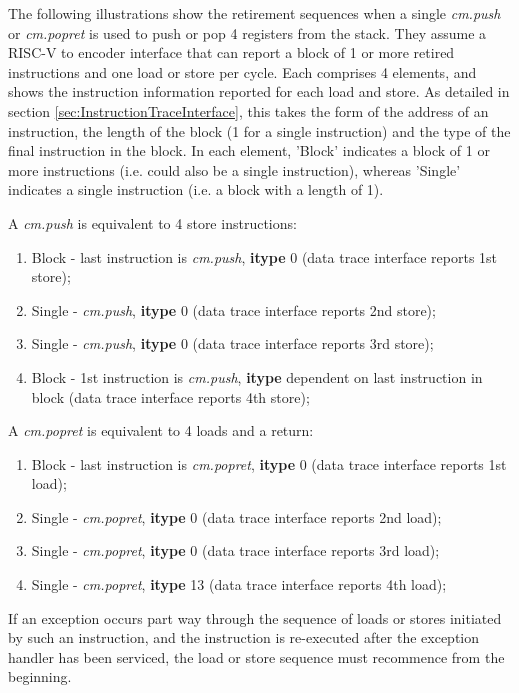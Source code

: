 The following illustrations show the retirement sequences when a single 
\textit{cm.push} or \textit{cm.popret} is used to push or pop 4 registers from the stack.
They assume a RISC-V to encoder interface that can report a block of 1 or more retired instructions 
and one load or store per cycle.  Each comprises 4 elements, and shows the instruction information 
reported for each load and store.  As detailed in section \ref{sec:InstructionTraceInterface}, this takes the 
form of the address of an instruction, the length of the block (1 for a single instruction) and the type of the final 
instruction in the block.  In each element, 'Block' indicates a block of 1 or more instructions 
(i.e. could also be a single instruction), whereas 'Single' indicates a single instruction (i.e. a block with a length of 1).

A \textit{cm.push} is equivalent to 4 store instructions:
\begin{enumerate}
  \item Block - last instruction is \textit{cm.push}, \textbf{itype} 0 (data trace interface reports 1st store);
  \item Single - \textit{cm.push}, \textbf{itype} 0 (data trace interface reports 2nd store);
  \item Single - \textit{cm.push}, \textbf{itype} 0 (data trace interface reports 3rd store);
  \item Block - 1st instruction is \textit{cm.push}, \textbf{itype} dependent on last instruction in block (data trace interface reports 4th store);
\end{enumerate}

A \textit{cm.popret} is equivalent to 4 loads and a return:
\begin{enumerate}
  \item Block - last instruction is \textit{cm.popret}, \textbf{itype} 0 (data trace interface reports 1st load);
  \item Single - \textit{cm.popret}, \textbf{itype} 0 (data trace interface reports 2nd load);
  \item Single - \textit{cm.popret}, \textbf{itype} 0 (data trace interface reports 3rd load);
  \item Single - \textit{cm.popret}, \textbf{itype} 13 (data trace interface reports 4th load);
\end{enumerate}

If an exception
occurs part way through the sequence of loads or stores initiated by such an instruction,
and the instruction is re-executed after the exception handler has been serviced, the
load or store sequence must recommence from the beginning.

